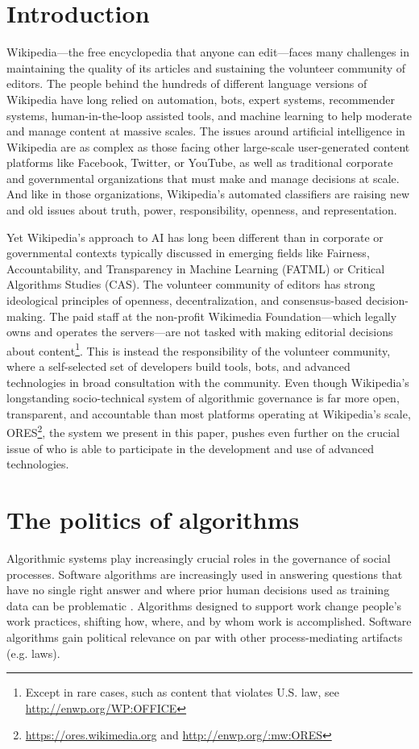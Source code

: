 \documentclass{sigchi-ext}
\begin{document}
\section{Introduction}
Wikipedia---the free encyclopedia that anyone can edit---faces many challenges in maintaining the quality of its articles and sustaining the volunteer community of editors. The people behind the hundreds of different language versions of Wikipedia have long relied on automation, bots, expert systems, recommender systems, human-in-the-loop assisted tools, and machine learning to help moderate and manage content at massive scales. The issues around artificial intelligence in Wikipedia are as complex as those facing other large-scale user-generated content platforms like Facebook, Twitter, or YouTube, as well as traditional corporate and governmental organizations that must make and manage decisions at scale. And like in those organizations, Wikipedia's automated classifiers are raising new and old issues about truth, power, responsibility, openness, and representation.

Yet Wikipedia's approach to AI has long been different than in corporate or governmental contexts typically discussed in emerging fields like Fairness, Accountability, and Transparency in Machine Learning (FATML) or Critical Algorithms Studies (CAS). The volunteer community of editors has strong ideological principles of openness, decentralization, and consensus-based decision-making. The paid staff at the non-profit Wikimedia Foundation---which legally owns and operates the servers---are not tasked with making editorial decisions about content\footnote{Except in rare cases, such as content that violates U.S. law, see \url{http://enwp.org/WP:OFFICE}}. This is instead the responsibility of the volunteer community, where a self-selected set of developers build tools, bots, and advanced technologies in broad consultation with the community. Even though Wikipedia's longstanding socio-technical system of algorithmic governance is far more open, transparent, and accountable than most platforms operating at Wikipedia's scale, ORES\footnote{\url{https://ores.wikimedia.org} and \url{http://enwp.org/:mw:ORES}}, the system we present in this paper, pushes even further on the crucial issue of who is able to participate in the development and use of advanced technologies.

\section{The politics of algorithms}
Algorithmic systems play increasingly crucial roles in the governance of social processes\cite{gillespie2014relevance}. Software algorithms are increasingly used in answering questions that have no single right answer and where prior human decisions used as training data can be problematic \cite{barocas2013governing}. Algorithms designed to support work change people's work practices, shifting how, where, and by whom work is accomplished\cite{crawford2016algorithm, zuboff1988age}. Software algorithms gain political relevance on par with other process-mediating artifacts (e.g. laws\cite{lessig1999code}).
\end{document}
